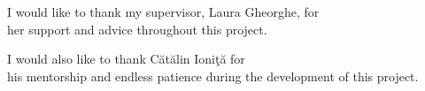 \vspace*{7cm}
\begin{center}
I would like to thank my supervisor, Laura Gheorghe, for\\
her support and advice throughout this project.
\end{center}
\vspace{0.6cm}
\begin{center}
I would also like to thank C\u{a}t\u{a}lin Ioni\c{t}\u{a} for\\
his mentorship and endless patience during the development of this project.
\end{center}
